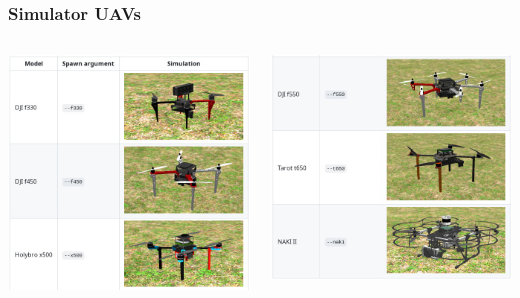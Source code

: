 \documentclass[aspectratio=169,9pt]{beamer}
\begin{document}
\begin{frame}
  \frametitle{Simulator UAVs}

  \begin{columns}[c]

    \includegraphics[width=1.0\textwidth]{./fig/simulator_uavs_1.jpg}

    \includegraphics[width=1.0\textwidth]{./fig/simulator_uavs_2.jpg}

  \end{columns}

\end{frame}
\end{document}
